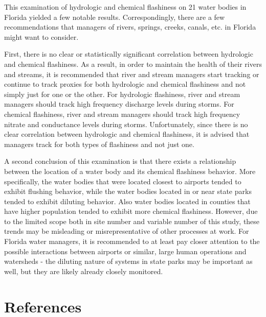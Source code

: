 \documentclass[12pt,]{article}
\begin{document}
This examination of hydrologic and chemical flashiness on 21 water
bodies in Florida yielded a few notable results. Correspondingly, there
are a few recommendations that managers of rivers, springs, creeks,
canals, etc. in Florida might want to consider.

First, there is no clear or statistically significant correlation
between hydrologic and chemical flashiness. As a result, in order to
maintain the health of their rivers and streams, it is recommended that
river and stream managers start tracking or continue to track proxies
for both hydrologic and chemical flashiness and not simply just for one
or the other. For hydrologic flashiness, river and stream managers
should track high frequency discharge levels during storms. For chemical
flashiness, river and stream managers should track high frequency
nitrate and conductance levels during storms. Unfortunately, since there
is no clear correlation between hydrologic and chemical flashiness, it
is advised that managers track for both types of flashiness and not just
one.

A second conclusion of this examination is that there exists a
relationship between the location of a water body and its chemical
flashiness behavior. More specifically, the water bodies that were
located closest to airports tended to exhibit flushing behavior, while
the water bodies located in or near state parks tended to exhibit
diluting behavior. Also water bodies located in counties that have
higher population tended to exhibit more chemical flashiness. However,
due to the limited scope both in site number and variable number of this
study, these trends may be misleading or misrepresentative of other
processes at work. For Florida water managers, it is recommended to at
least pay closer attention to the possible interactions between airports
or similar, large human operations and watersheds - the diluting nature
of systems in state parks may be important as well, but they are likely
already closely monitored.

\newpage

\hypertarget{references}{%
\section{References}\label{references}}
\end{document}
